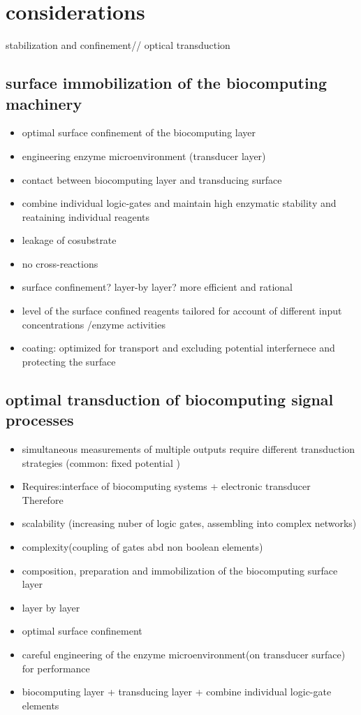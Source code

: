 \documentclass[runningheads]{llncs}
\begin{document}
\section{considerations}
	stabilization and confinement//
	optical transduction 
	\subsection{surface immobilization of the biocomputing machinery}
	
	
	
	\begin{itemize}
		\item optimal surface confinement of the biocomputing layer
		\item engineering enzyme microenvironment (transducer layer)
		\item contact between biocomputing layer and transducing surface
		\item combine individual logic-gates and maintain high enzymatic stability and reataining individual reagents
		\item leakage of cosubstrate 
		\item no cross-reactions
		\item surface confinement? layer-by layer? more efficient and rational 
		\item level of the surface confined reagents tailored for account of different input concentrations /enzyme activities 
		\item coating: optimized for transport and excluding potential interfernece and protecting the surface
	\end{itemize}

\subsection{optimal transduction of biocomputing signal processes}
	\begin{itemize}
		\item simultaneous measurements of multiple outputs require different transduction strategies (common: fixed potential )
	\end{itemize}
	\begin{itemize}
		\item Requires:interface of biocomputing systems + electronic transducer\\
		Therefore
		\item scalability (increasing nuber of logic gates, assembling into complex networks)
		\item complexity(coupling of gates abd non boolean elements)
		\item composition, preparation and immobilization of the biocomputing surface layer
		\item layer by layer
		\item optimal surface confinement 
		\item careful engineering of the enzyme microenvironment(on transducer surface) for performance
		\item biocomputing layer + transducing layer + combine individual logic-gate elements	
	\end{itemize}
\end{document}

